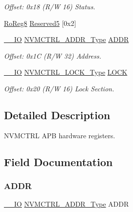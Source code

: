 \begin{DoxyCompactItemize}
\begin{DoxyCompactList}\small\item\em Offset\+: 0x18 (R/W 16) Status. \end{DoxyCompactList}\item 
\mbox{\hyperlink{group___s_a_m_d21_e15_a__definitions_ga0d957f1433aaf5d70e4dc2b68288442d}{Ro\+Reg8}} \mbox{\hyperlink{struct_nvmctrl_a5771b852409b146285e223c4265972b8}{Reserved5}} \mbox{[}0x2\mbox{]}
\item 
\mbox{\hyperlink{core__cm0plus_8h_aec43007d9998a0a0e01faede4133d6be}{\+\_\+\+\_\+\+IO}} \mbox{\hyperlink{union_n_v_m_c_t_r_l___a_d_d_r___type}{N\+V\+M\+C\+T\+R\+L\+\_\+\+A\+D\+D\+R\+\_\+\+Type}} \mbox{\hyperlink{struct_nvmctrl_ab3ad1564f34bc4fb461d9ccbf4599ccb}{A\+D\+DR}}
\begin{DoxyCompactList}\small\item\em Offset\+: 0x1C (R/W 32) Address. \end{DoxyCompactList}\item 
\mbox{\hyperlink{core__cm0plus_8h_aec43007d9998a0a0e01faede4133d6be}{\+\_\+\+\_\+\+IO}} \mbox{\hyperlink{union_n_v_m_c_t_r_l___l_o_c_k___type}{N\+V\+M\+C\+T\+R\+L\+\_\+\+L\+O\+C\+K\+\_\+\+Type}} \mbox{\hyperlink{struct_nvmctrl_a6d3c2a6df1a09849e28a79af84eb49ac}{L\+O\+CK}}
\begin{DoxyCompactList}\small\item\em Offset\+: 0x20 (R/W 16) Lock Section. \end{DoxyCompactList}\end{DoxyCompactItemize}


\subsection{Detailed Description}
N\+V\+M\+C\+T\+RL A\+PB hardware registers. 

\subsection{Field Documentation}
\mbox{\label{struct_nvmctrl_ab3ad1564f34bc4fb461d9ccbf4599ccb}} 
\subsubsection{\texorpdfstring{ADDR}{ADDR}}
{\footnotesize\ttfamily \mbox{\hyperlink{core__cm0plus_8h_aec43007d9998a0a0e01faede4133d6be}{\+\_\+\+\_\+\+IO}} \mbox{\hyperlink{union_n_v_m_c_t_r_l___a_d_d_r___type}{N\+V\+M\+C\+T\+R\+L\+\_\+\+A\+D\+D\+R\+\_\+\+Type}} A\+D\+DR}



